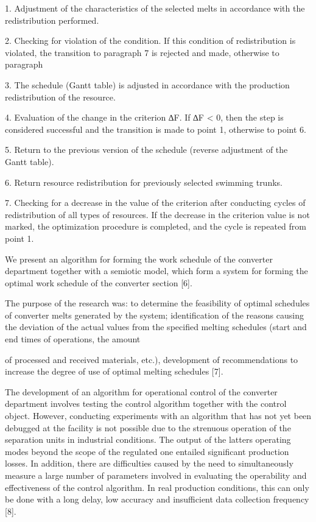 \begin{multicols}{2}
1. Adjustment of the characteristics of the selected melts in accordance
with the redistribution performed.

2. Checking for violation of the condition. If this condition of
redistribution is violated, the transition to paragraph 7 is rejected
and made, otherwise to paragraph

3. The schedule (Gantt table) is adjusted in accordance with the
production redistribution of the resource.

4. Evaluation of the change in the criterion ∆F. If ∆F \textless{} 0,
then the step is considered successful and the transition is made to
point 1, otherwise to point 6.

5. Return to the previous version of the schedule (reverse adjustment of
the Gantt table).

6. Return resource redistribution for previously selected swimming
trunks.

7. Checking for a decrease in the value of the criterion after
conducting cycles of redistribution of all types of resources. If the
decrease in the criterion value is not marked, the optimization
procedure is completed, and the cycle is repeated from point 1.

We present an algorithm for forming the work schedule of the converter
department together with a semiotic model, which form a system for
forming the optimal work schedule of the converter section {[}6{]}.

The purpose of the research was: to determine the feasibility of optimal
schedules of converter melts generated by the system; identification of
the reasons causing the deviation of the actual values from the
specified melting schedules (start and end times of operations, the
amount

of processed and received materials, etc.), development of
recommendations to increase the degree of use of optimal melting
schedules {[}7{]}.

The development of an algorithm for operational control of the converter
department involves testing the control algorithm together with the
control object. However, conducting experiments with an algorithm that
has not yet been debugged at the facility is not possible due to the
strenuous operation of the separation units in industrial conditions.
The output of the latter\textquotesingle s operating modes beyond the
scope of the regulated one entailed significant production losses. In
addition, there are difficulties caused by the need to simultaneously
measure a large number of parameters involved in evaluating the
operability and effectiveness of the control algorithm. In real
production conditions, this can only be done with a long delay, low
accuracy and insufficient data collection frequency {[}8{]}.


\end{multicols}
